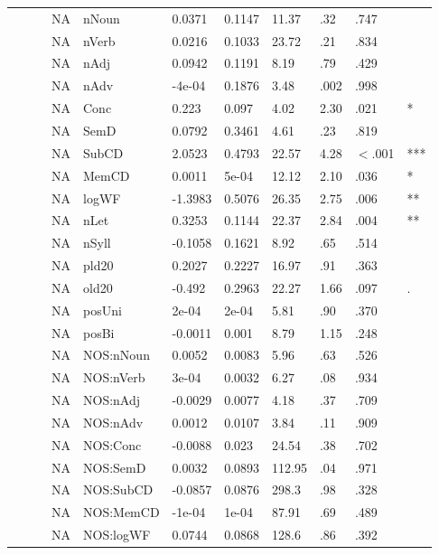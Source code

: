 \begin{table}[ht]
\begin{tabular}{lllllllllll}
   &  &  & NA & nNoun & 0.0371 & 0.1147 & 11.37 & .32 & .747 &   \\ 
   &  &  & NA & nVerb & 0.0216 & 0.1033 & 23.72 & .21 & .834 &   \\ 
   &  &  & NA & nAdj & 0.0942 & 0.1191 & 8.19 & .79 & .429 &   \\ 
   &  &  & NA & nAdv & -4e-04 & 0.1876 & 3.48 & .002 & .998 &   \\ 
   &  &  & NA & Conc & 0.223 & 0.097 & 4.02 & 2.30 & .021 & * \\ 
   &  &  & NA & SemD & 0.0792 & 0.3461 & 4.61 & .23 & .819 &   \\ 
   &  &  & NA & SubCD & 2.0523 & 0.4793 & 22.57 & 4.28 & $<$.001 & *** \\ 
   &  &  & NA & MemCD & 0.0011 & 5e-04 & 12.12 & 2.10 & .036 & * \\ 
   &  &  & NA & logWF & -1.3983 & 0.5076 & 26.35 & 2.75 & .006 & ** \\ 
   &  &  & NA & nLet & 0.3253 & 0.1144 & 22.37 & 2.84 & .004 & ** \\ 
   &  &  & NA & nSyll & -0.1058 & 0.1621 & 8.92 & .65 & .514 &   \\ 
   &  &  & NA & pld20 & 0.2027 & 0.2227 & 16.97 & .91 & .363 &   \\ 
   &  &  & NA & old20 & -0.492 & 0.2963 & 22.27 & 1.66 & .097 & . \\ 
   &  &  & NA & posUni & 2e-04 & 2e-04 & 5.81 & .90 & .370 &   \\ 
   &  &  & NA & posBi & -0.0011 & 0.001 & 8.79 & 1.15 & .248 &   \\ 
   &  &  & NA & NOS:nNoun & 0.0052 & 0.0083 & 5.96 & .63 & .526 &   \\ 
   &  &  & NA & NOS:nVerb & 3e-04 & 0.0032 & 6.27 & .08 & .934 &   \\ 
   &  &  & NA & NOS:nAdj & -0.0029 & 0.0077 & 4.18 & .37 & .709 &   \\ 
   &  &  & NA & NOS:nAdv & 0.0012 & 0.0107 & 3.84 & .11 & .909 &   \\ 
   &  &  & NA & NOS:Conc & -0.0088 & 0.023 & 24.54 & .38 & .702 &   \\ 
   &  &  & NA & NOS:SemD & 0.0032 & 0.0893 & 112.95 & .04 & .971 &   \\ 
   &  &  & NA & NOS:SubCD & -0.0857 & 0.0876 & 298.3 & .98 & .328 &   \\ 
   &  &  & NA & NOS:MemCD & -1e-04 & 1e-04 & 87.91 & .69 & .489 &   \\ 
   &  &  & NA & NOS:logWF & 0.0744 & 0.0868 & 128.6 & .86 & .392 &   \\ 

\end{tabular}
\end{table}
